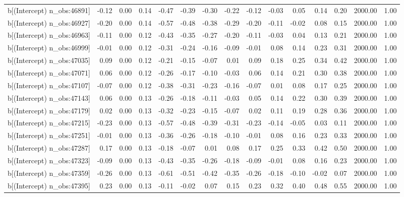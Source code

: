 \begin{table}[ht]
\begin{tabular}{rrrrrrrrrrrrrrr}
  b[(Intercept) n\_obs:46891] & -0.12 & 0.00 & 0.14 & -0.47 & -0.39 & -0.30 & -0.22 & -0.12 & -0.03 & 0.05 & 0.14 & 0.20 & 2000.00 & 1.00 \\ 
  b[(Intercept) n\_obs:46927] & -0.20 & 0.00 & 0.14 & -0.57 & -0.48 & -0.38 & -0.29 & -0.20 & -0.11 & -0.02 & 0.08 & 0.15 & 2000.00 & 1.00 \\ 
  b[(Intercept) n\_obs:46963] & -0.11 & 0.00 & 0.12 & -0.43 & -0.35 & -0.27 & -0.20 & -0.11 & -0.03 & 0.04 & 0.13 & 0.21 & 2000.00 & 1.00 \\ 
  b[(Intercept) n\_obs:46999] & -0.01 & 0.00 & 0.12 & -0.31 & -0.24 & -0.16 & -0.09 & -0.01 & 0.08 & 0.14 & 0.23 & 0.31 & 2000.00 & 1.00 \\ 
  b[(Intercept) n\_obs:47035] & 0.09 & 0.00 & 0.12 & -0.21 & -0.15 & -0.07 & 0.01 & 0.09 & 0.18 & 0.25 & 0.34 & 0.42 & 2000.00 & 1.00 \\ 
  b[(Intercept) n\_obs:47071] & 0.06 & 0.00 & 0.12 & -0.26 & -0.17 & -0.10 & -0.03 & 0.06 & 0.14 & 0.21 & 0.30 & 0.38 & 2000.00 & 1.00 \\ 
  b[(Intercept) n\_obs:47107] & -0.07 & 0.00 & 0.12 & -0.38 & -0.31 & -0.23 & -0.16 & -0.07 & 0.01 & 0.08 & 0.17 & 0.25 & 2000.00 & 1.00 \\ 
  b[(Intercept) n\_obs:47143] & 0.06 & 0.00 & 0.13 & -0.26 & -0.18 & -0.11 & -0.03 & 0.05 & 0.14 & 0.22 & 0.30 & 0.39 & 2000.00 & 1.00 \\ 
  b[(Intercept) n\_obs:47179] & 0.02 & 0.00 & 0.13 & -0.32 & -0.23 & -0.15 & -0.07 & 0.02 & 0.11 & 0.19 & 0.28 & 0.36 & 2000.00 & 1.00 \\ 
  b[(Intercept) n\_obs:47215] & -0.23 & 0.00 & 0.13 & -0.57 & -0.48 & -0.39 & -0.31 & -0.23 & -0.14 & -0.05 & 0.03 & 0.11 & 2000.00 & 1.00 \\ 
  b[(Intercept) n\_obs:47251] & -0.01 & 0.00 & 0.13 & -0.36 & -0.26 & -0.18 & -0.10 & -0.01 & 0.08 & 0.16 & 0.23 & 0.33 & 2000.00 & 1.00 \\ 
  b[(Intercept) n\_obs:47287] & 0.17 & 0.00 & 0.13 & -0.18 & -0.07 & 0.01 & 0.08 & 0.17 & 0.25 & 0.33 & 0.42 & 0.50 & 2000.00 & 1.00 \\ 
  b[(Intercept) n\_obs:47323] & -0.09 & 0.00 & 0.13 & -0.43 & -0.35 & -0.26 & -0.18 & -0.09 & -0.01 & 0.08 & 0.16 & 0.23 & 2000.00 & 1.00 \\ 
  b[(Intercept) n\_obs:47359] & -0.26 & 0.00 & 0.13 & -0.61 & -0.51 & -0.42 & -0.35 & -0.26 & -0.18 & -0.10 & -0.02 & 0.07 & 2000.00 & 1.00 \\ 
  b[(Intercept) n\_obs:47395] & 0.23 & 0.00 & 0.13 & -0.11 & -0.02 & 0.07 & 0.15 & 0.23 & 0.32 & 0.40 & 0.48 & 0.55 & 2000.00 & 1.00 \\ 

\end{tabular}
\end{table}
